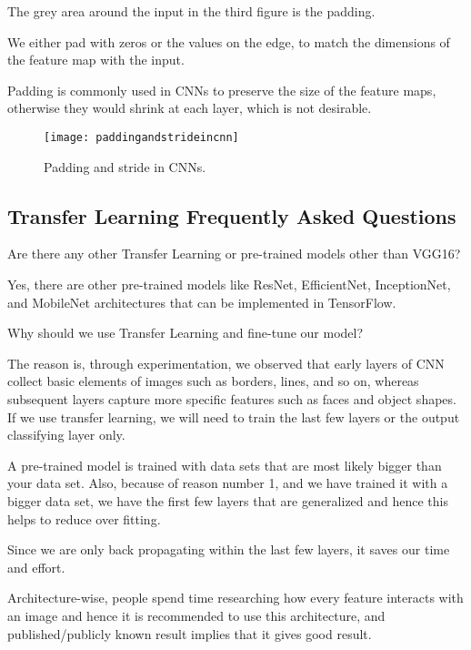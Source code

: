 	\begin{bulletedlist}
		\item The grey area around the input in the third figure is the padding.
		\item We either pad with zeros or the values on the edge, to match the dimensions of the feature map with the input.
		\item Padding is commonly used in CNNs to preserve the size of the feature maps, otherwise they would shrink at each layer, which is not desirable.
	\end{bulletedlist}

	\begin{figure}[h]
		\centering
		\texttt{[image: paddingandstrideincnn]}
		\caption[Padding and stride in CNNs]{Padding and stride in CNNs.}
		\label{fig:paddingandstrideincnn}
	\end{figure}


	\subsection{Transfer Learning Frequently Asked Questions}
	\begin{qanda}
		\begin{question}
Are there any other Transfer Learning or pre-trained models other than VGG16?
		\end{question}
		\begin{answer}
Yes, there are other pre-trained models like ResNet, EfficientNet, InceptionNet, and MobileNet architectures that can be implemented in TensorFlow.
		\end{answer}
	\end{qanda}

	\begin{qanda}
		\begin{question}
Why should we use Transfer Learning and fine-tune our model?
		\end{question}
		\begin{answer}
The reason is, through experimentation, we observed that early layers of CNN collect basic elements of images such as borders, lines, and so on, whereas subsequent layers capture more specific features such as faces and object shapes. If we use transfer learning, we will need to train the last few layers or the output classifying layer only.

A pre-trained model is trained with data sets that are most likely bigger than your data set. Also, because of reason number 1, and we have trained it with a bigger data set, we have the first few layers that are generalized and hence this helps to reduce over fitting.

Since we are only back propagating within the last few layers, it saves our time and effort.

Architecture-wise, people spend time researching how every feature interacts with an image and hence it is recommended to use this architecture, and published/publicly known result implies that it gives good result.
		\end{answer}
	\end{qanda}

